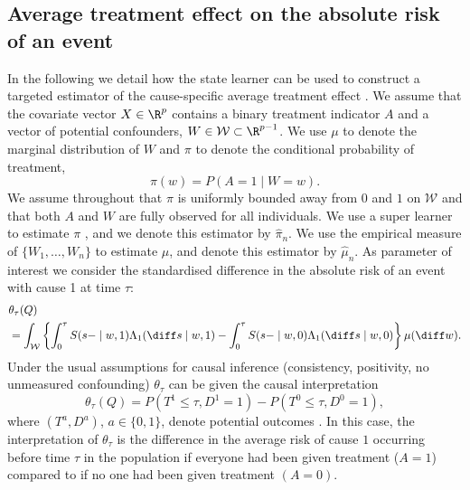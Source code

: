 \subsection{Average treatment effect on the absolute risk of an event}
\label{sec:cause-spec-aver}

In the following we detail how the state learner can be used to
construct a targeted estimator of the cause-specific average treatment
effect \citep{rytgaard2022targeted}. We assume that the covariate
vector \( X \in \R^p \) contains a binary treatment indicator \( A \)
and a vector of potential confounders,
\( W \in \mathcal{W}\subset \R^{p-1} \).  We use $\mu$ to denote the
marginal distribution of \( W \) and $\pi$ to denote the conditional
probability of treatment,
\begin{equation*}
  \pi(w) = P(A=1 \mid W=w).
\end{equation*}
We assume throughout that $\pi$ is uniformly bounded away from \( 0 \)
and \( 1 \) on \( \mathcal{W} \) and that both \( A \) and \( W \) are
fully observed for all individuals. We use a super learner to
estimate $\pi$ \citep{Polley_Ledell_Kennedy_Laan_2023_Superlearn}, and
we denote this estimator by $\hat{\pi}_n$. We use the empirical
measure of \( \{W_1, \dots, W_n\} \) to estimate $\mu$, and denote
this estimator by $\hat{\mu}_n$. As parameter of interest we consider
the standardised difference in the absolute risk of an event with
cause 1 at time $\tau$:
\begin{align*}
  & \theta_{{\tau}}(Q)
  \\
  & = \int_{\mathcal{W}} 
    \left\{
    \int_0^{\tau}
    S(s- \mid w, 1)  \Lambda_1(\diff s \mid w, 1)
    -
    \int_0^{\tau}
    S(s- \mid w, 0)  \Lambda_1(\diff s \mid w, 0)
    \right\}
    \mu(\diff w).
\end{align*}
Under the usual assumptions for causal inference (consistency,
positivity, no unmeasured confounding) \( \theta_{{\tau}} \) can be
given the causal interpretation
\begin{equation*}
  \theta_{{\tau}}(Q) =
  P{(T^{1} \leq \tau, D^{1}=1)}-
  P{(T^{0} \leq \tau, D^{0}=1)},
\end{equation*}
where \( (T^a, D^a) \), \( a \in \{0,1\} \), denote potential outcomes
\citep{hernanRobinsWhatIf}. In this case, the interpretation of $\theta_{\tau}$
is the difference in the average risk of cause \( 1 \) occurring before time
\( \tau \) in the population if everyone had been given treatment (\( A=1 \))
compared to if no one had been given treatment \( (A=0) \).

